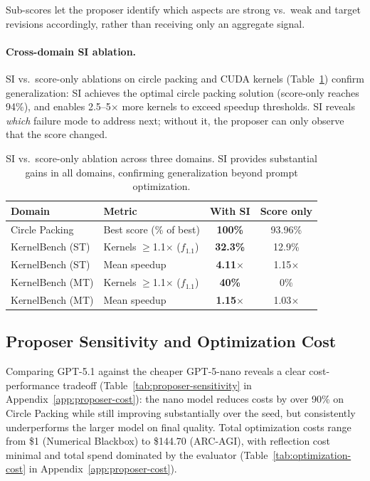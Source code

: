 \documentclass[sigconf]{acmart}
\begin{document}
Sub-scores let the proposer identify which aspects are strong vs.\ weak and target revisions accordingly, rather than receiving only an aggregate signal.

\paragraph{Cross-domain SI ablation.} SI vs.\ score-only ablations on circle packing and CUDA kernels (Table~\ref{tab:si-cross-domain}) confirm generalization: SI achieves the optimal circle packing solution (score-only reaches 94\%), and enables 2.5--5$\times$ more kernels to exceed speedup thresholds. SI reveals \emph{which} failure mode to address next; without it, the proposer can only observe that the score changed.

\begin{table}[t]
\caption{SI vs.\ score-only ablation across three domains. SI provides substantial gains in all domains, confirming generalization beyond prompt optimization.}
\label{tab:si-cross-domain}
\small
\begin{tabular}{@{}llcc@{}}
\toprule
\textbf{Domain} & \textbf{Metric} & \textbf{With SI} & \textbf{Score only} \\
\midrule
Circle Packing & Best score (\% of best) & \textbf{100\%} & 93.96\% \\
KernelBench (ST) & Kernels $\geq$1.1$\times$ ($f_{1.1}$) & \textbf{32.3\%} & 12.9\% \\
KernelBench (ST) & Mean speedup & \textbf{4.11$\times$} & 1.15$\times$ \\
KernelBench (MT) & Kernels $\geq$1.1$\times$ ($f_{1.1}$) & \textbf{40\%} & 0\% \\
KernelBench (MT) & Mean speedup & \textbf{1.15$\times$} & 1.03$\times$ \\
\bottomrule
\end{tabular}
\end{table}

\subsection{Proposer Sensitivity and Optimization Cost}\label{sec:proposer-sensitivity}%
\label{sec:cost}

Comparing GPT-5.1 against the cheaper GPT-5-nano reveals a clear cost-performance tradeoff (Table~\ref{tab:proposer-sensitivity} in Appendix~\ref{app:proposer-cost}): the nano model reduces costs by over 90\% on Circle Packing while still improving substantially over the seed, but consistently underperforms the larger model on final quality. Total optimization costs range from \$1 (Numerical Blackbox) to \$144.70 (ARC-AGI), with reflection cost minimal and total spend dominated by the evaluator (Table~\ref{tab:optimization-cost} in Appendix~\ref{app:proposer-cost}).
\end{document}
